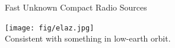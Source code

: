 \documentclass[ignorenonframetext]{beamer}
\begin{document}


\begin{frame}{Fast Unknown Compact Radio Sources}
\begin{center}
\texttt{[image: fig/elaz.jpg]}\\
 Consistent with something in low-earth orbit.
 \end{center}
\end{frame}
\end{document}
